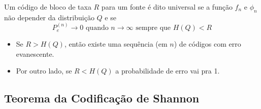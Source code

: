 \begin{frame}[allowframebreaks]
  \framebreak

  \begin{definition}
  Um código de bloco de taxa $R$ para um fonte é dito universal se a função $f_n$ e $\phi_n$
  não depender da distribuição $Q$ e se 
	\begin{equation}
	P_e^{(n)} \rightarrow 0 \text{ quando } n \rightarrow \infty \text{ sempre que } H(Q) < R
        \end{equation}
  \end{definition}
  \begin{itemize} 
  \item Se $R > H(Q)$, então existe uma sequência (em $n$) de códigos com erro evanescente.
  \item Por outro lado, se $R < H(Q)$ a probabilidade de erro vai pra 1.
  \end{itemize}
\end{frame}


\subsection{Teorema da Codificação de Shannon}

